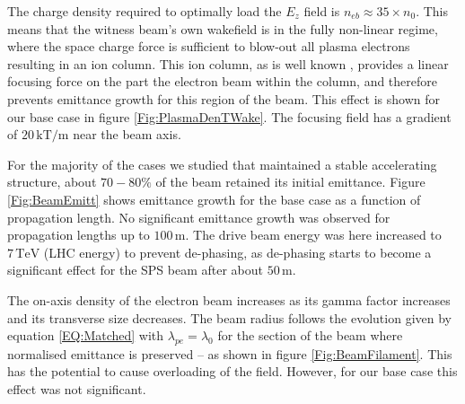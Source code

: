 \documentclass[aps,prstab,reprint,amsmath,amssymb,groupedaddress]{revtex4-1}
\newcommand{\unit}[1]{\,\mathrm{#1}}
\begin{document}
The charge density required to optimally load the $E_{z}$ field is $n_{eb} \approx 35\times n_{0}$. This means that the
witness beam's own wakefield is in the fully non-linear regime, where the space charge force is sufficient to blow-out
all plasma electrons resulting in an ion column. This ion column, as is well known \cite{rosenzweig:1991}, provides a
linear focusing force on the part the electron beam within the column, and therefore prevents emittance growth for this
region of the beam. This effect is shown for our base case in figure \ref{Fig:PlasmaDenTWake}. The focusing field has a
gradient of $20\unit{kT/m}$ near the beam axis.



For the majority of the cases we studied that maintained a stable accelerating structure, about $70-80\%$ of the beam
retained its initial emittance. Figure \ref{Fig:BeamEmitt} shows emittance growth for the base case as a function of
propagation length. No significant emittance growth was observed for propagation lengths up to $100\unit{m}$. The drive
beam energy was here increased to $7\unit{TeV}$ (LHC energy) to prevent de-phasing, as de-phasing starts to become a
significant effect for the SPS beam after about $50\unit{m}$.

The on-axis density of the electron beam increases as its gamma factor increases and its transverse size decreases. The
beam radius follows the evolution given by equation \ref{EQ:Matched} with $\lambda_{pe} = \lambda_{0}$ for the section
of the beam where normalised emittance is preserved -- as shown in figure \ref{Fig:BeamFilament}. This has the potential
to cause overloading of the field. However, for our base case this effect was not significant.
\end{document}
